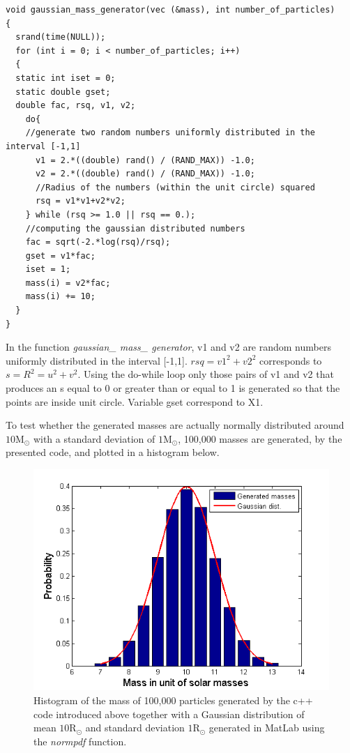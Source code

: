 \begin{lstlisting}
void gaussian_mass_generator(vec (&mass), int number_of_particles)
{
  srand(time(NULL));
  for (int i = 0; i < number_of_particles; i++)
  {
  static int iset = 0;
  static double gset;
  double fac, rsq, v1, v2;
    do{
	//generate two random numbers uniformly distributed in the interval [-1,1]   
      v1 = 2.*((double) rand() / (RAND_MAX)) -1.0;
      v2 = 2.*((double) rand() / (RAND_MAX)) -1.0;
      //Radius of the numbers (within the unit circle) squared
      rsq = v1*v1+v2*v2;
    } while (rsq >= 1.0 || rsq == 0.);
    //computing the gaussian distributed numbers
    fac = sqrt(-2.*log(rsq)/rsq);
    gset = v1*fac;
    iset = 1;
    mass(i) = v2*fac;
    mass(i) += 10;
  }
}
\end{lstlisting}
In the function \textit{gaussian\_ mass\_ generator}, v1 and v2 are random numbers uniformly distributed in the interval [-1,1]. $rsq = v1^2 + v2^2$  corresponds to $s = R ^2 = u^2 + v^2$. 
Using the do-while loop only those pairs of v1 and v2 that produces an s equal to 0 or greater than or equal to 1 is generated so that the points are inside unit circle.  Variable gset  correspond to X1.

To test whether the generated masses are actually normally distributed around $10\text{M}_{\odot}$ with a standard deviation of $1\text{M}_{\odot}$, 100,000 masses are generated, by the presented code, and plotted in a histogram below. 
\begin{figure}[H]
\centering
	\includegraphics[width=0.7\linewidth]{Figures/random_mass_test.png}
\caption{
Histogram of the mass of 100,000 particles generated by the c++ code introduced above together with a Gaussian distribution of mean $10 \text{R}_{\odot}$ and standard deviation $1 \text{R}_{\odot}$ generated in MatLab using the \textit{normpdf} function. 
}
\label{fig:GaussianGeneratedMass}
\end{figure}

